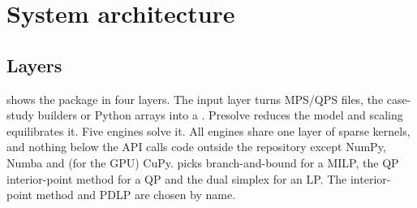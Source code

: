 \section{System architecture}\label{sec:architecture}

\subsection{Layers}
 shows the package in four layers. The input layer turns MPS/QPS files, the
case-study builders or Python arrays into a . Presolve reduces the model and
scaling equilibrates it. Five engines solve it. All engines share one layer of sparse kernels, and
nothing below the API calls code outside the repository except NumPy, Numba and (for the GPU)
CuPy.  picks branch-and-bound for a MILP, the QP
interior-point method for a QP and the dual simplex for an LP. The interior-point method and
PDLP are chosen by name.

